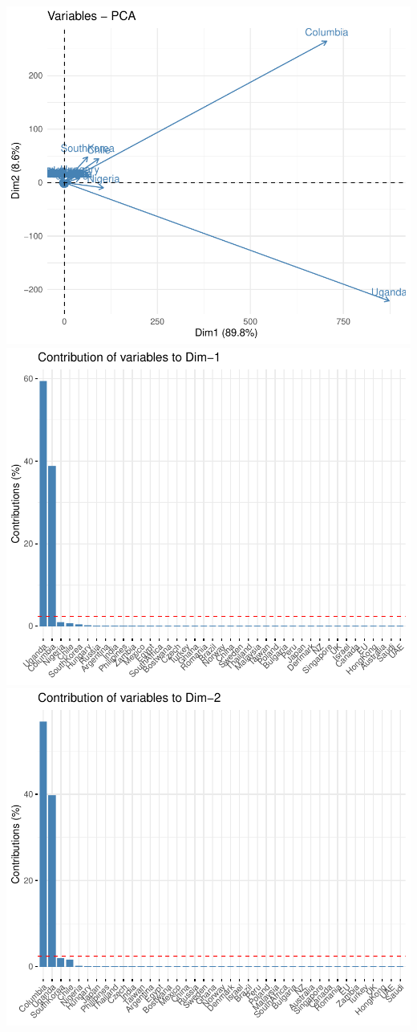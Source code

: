 \documentclass[11pt,preprint, authoryear]{elsarticle}
\numberwithin{equation}{section}
\numberwithin{figure}{section}
\numberwithin{table}{section}
\begin{document}
\includegraphics{Essay_files/figure-latex/unnamed-chunk-5-5.pdf}
\includegraphics{Essay_files/figure-latex/unnamed-chunk-5-6.pdf}
\includegraphics{Essay_files/figure-latex/unnamed-chunk-5-7.pdf}
\end{document}

